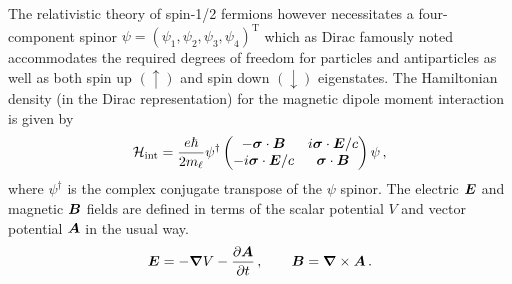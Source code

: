 The relativistic theory of spin-1/2 fermions however necessitates a four-component spinor $\psi=(\psi_{1},\psi_{2},\psi_{3},\psi_{4})^\mathrm{T}$ which as Dirac famously noted accommodates the required degrees of freedom for particles and antiparticles as well as both spin up $(\uparrow)$ and spin down $(\downarrow)$ eigenstates. The Hamiltonian density (in the Dirac representation) for the magnetic dipole moment interaction is given by
\begin{gather}
	\label{pauli:2}
    \mathcal{H}_\mathrm{int} = \frac{e\hbar}{2m_{\ell}}\psi^{\dag}
    \begin{pmatrix}
        -\boldsymbol{\sigma}\cdot\boldsymbol{B} & i\boldsymbol{\sigma}\cdot\boldsymbol{E}/c\\
        -i\boldsymbol{\sigma}\cdot\boldsymbol{E}/c & \boldsymbol{\sigma}\cdot\boldsymbol{B}
    \end{pmatrix}
    \psi\,,
\end{gather}
where $\psi^{\dag}$ is the complex conjugate transpose of the $\psi$ spinor. The electric $\boldsymbol{E}$ and magnetic $\boldsymbol{B}$ fields are defined in terms of the scalar potential $V$ and vector potential $\boldsymbol{A}$ in the usual way.
\begin{align}
    \label{eb:1}
    \boldsymbol{E}=-\boldsymbol{\nabla}V-\frac{\partial\boldsymbol{A}}{\partial t}\,,\qquad
    \boldsymbol{B}=\boldsymbol{\nabla}\times\boldsymbol{A}\,.
\end{align}

